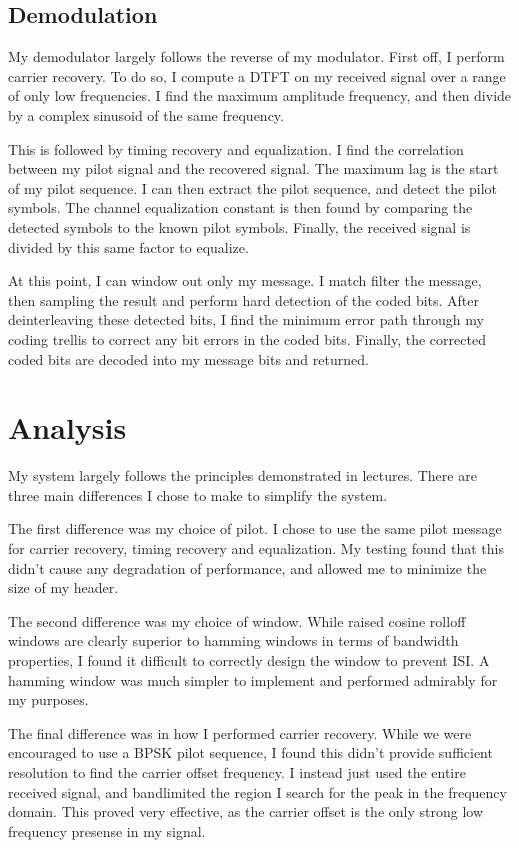 \documentclass[11pt]{scrartcl}
\begin{document}
\subsection*{Demodulation}

My demodulator largely follows the reverse of my modulator. First off, I perform
carrier recovery. To do so, I compute a DTFT on my received signal over a range
of only low frequencies. I find the maximum amplitude frequency, and then divide
by a complex sinusoid of the same frequency.

This is followed by timing recovery and equalization. I find the correlation
between my pilot signal and the recovered signal. The maximum lag is the start
of my pilot sequence. I can then extract the pilot sequence, and detect the
pilot symbols. The channel equalization constant is then found by comparing the
detected symbols to the known pilot symbols. Finally, the received signal is
divided by this same factor to equalize.

At this point, I can window out only my message. I match filter the message,
then sampling the result and perform hard detection of the coded bits. After
deinterleaving these detected bits, I find the minimum error path through my
coding trellis to correct any bit errors in the coded bits. Finally, the
corrected coded bits are decoded into my message bits and returned.




\section*{Analysis}

My system largely follows the principles demonstrated in lectures. There are
three main differences I chose to make to simplify the system.

The first difference was my choice of pilot. I chose to use the same pilot
message for carrier recovery, timing recovery and equalization. My testing found
that this didn't cause any degradation of performance, and allowed me to
minimize the size of my header.

The second difference was my choice of window. While raised cosine rolloff
windows are clearly superior to hamming windows in terms of bandwidth
properties, I found it difficult to correctly design the window to prevent ISI.
A hamming window was much simpler to implement and performed admirably for my
purposes.

The final difference was in how I performed carrier recovery. While we were
encouraged to use a BPSK pilot sequence, I found this didn't provide sufficient
resolution to find the carrier offset frequency. I instead just used the entire
received signal, and bandlimited the region I search for the peak in the
frequency domain. This proved very effective, as the carrier offset is the only
strong low frequency presense in my signal.
\end{document}
